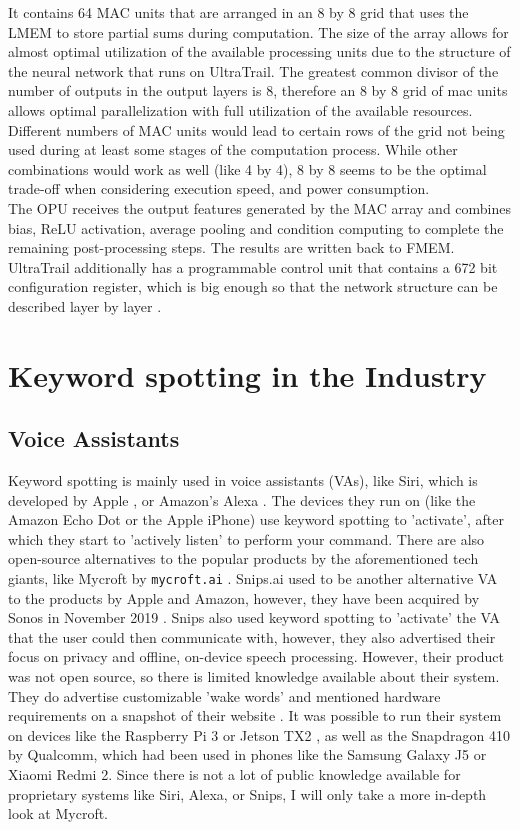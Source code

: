 It contains 64 MAC units that are arranged in an 8 by 8 grid that uses the LMEM to store partial sums during computation.
The size of the array allows for almost optimal utilization of the available processing units due to the structure of the
neural network that runs on UltraTrail.
The greatest common divisor of the number of outputs in the output layers is 8, therefore an 8 by 8 grid of mac units
allows optimal parallelization with full utilization of the available resources.
Different numbers of MAC units would lead to certain rows of the grid not being used during at least some stages of the
computation process.
While other combinations would work as well (like 4 by 4), 8 by 8 seems to be the optimal trade-off when
considering execution speed, and power consumption.
\\
The OPU receives the output features generated by the MAC array and combines bias, ReLU activation,
average pooling and condition computing to complete the remaining post-processing steps.
The results are written back to FMEM.
\\
UltraTrail additionally has a programmable control unit that contains a 672 bit
configuration register, which is big enough so that the network structure
can be described layer by layer \cite[Ch IV]{ultratrail}.

\newpage
\section{Keyword spotting in the Industry}

\subsection{Voice Assistants}

Keyword spotting is mainly used in voice assistants (VAs), like Siri, which is developed by Apple \cite{siri}, or Amazon's Alexa \cite{alexa}.
The devices they run on (like the Amazon Echo Dot or the Apple iPhone) use keyword spotting to 'activate', after which they start
to 'actively listen' to perform your command.
There are also open-source alternatives to the popular products by the aforementioned tech giants, like Mycroft by \lstinline{mycroft.ai} \cite{mycroft}.
Snips.ai used to be another alternative VA to the products by Apple and Amazon, however, they have been acquired by Sonos in November 2019 \cite{sonos_snips}.
Snips also used keyword spotting to 'activate' the VA that the user could then communicate with, however, they also advertised their focus
on privacy and offline, on-device speech processing.
However, their product was not open source, so there is limited knowledge available about their system.
They do advertise customizable 'wake words' and mentioned hardware requirements on a snapshot of their website \cite{snips_flow}.
It was possible to run their system on devices like the Raspberry Pi 3 \cite{rpi3} or Jetson TX2 \cite{jetson_tx2},
as well as the Snapdragon 410 \cite{snapdragon_410} by Qualcomm, which had been used in phones like the Samsung Galaxy J5 or Xiaomi Redmi 2.
Since there is not a lot of public knowledge available for proprietary systems like Siri, Alexa, or Snips, I will only take a more in-depth look at Mycroft.

